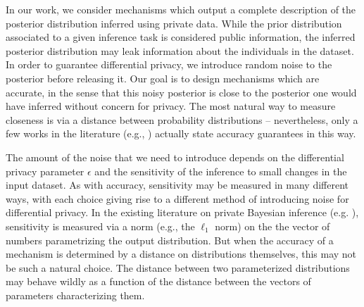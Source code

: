 \documentclass{article}
\begin{document}
%


In our work, we consider mechanisms which output a complete description of the posterior
distribution inferred using private data.
While the prior distribution associated to a given inference task is considered public information,
the inferred posterior distribution may leak information about the individuals in the dataset.
In order to guarantee differential privacy, we introduce random noise to the posterior before releasing it.
Our goal is to design mechanisms which are accurate, in the sense that this noisy posterior is close
to the posterior one would have inferred without concern for privacy. The most natural way
to measure closeness is via a distance between probability distributions -- nevertheless, only a few works 
in the literature (e.g., \cite{zhang2016differential}) actually state accuracy guarantees in this way.






The amount of the noise that we need to introduce
depends on the differential privacy parameter $\epsilon$ and the sensitivity of the inference to
small changes in the input dataset.
As with accuracy, sensitivity may be measured in many different ways, with each choice giving rise to a different
method of introducing noise for differential privacy.
In the existing literature on private Bayesian
inference (e.g. \cite{zhang2016differential,xiao2012bayesian}), sensitivity is measured via a norm (e.g., the $\ell_1$ norm)
on the the vector of numbers parametrizing the output distribution. But when the accuracy of a mechanism is determined by
a distance on distributions themselves, this may not be such a natural choice. The distance between
two parameterized distributions may behave wildly as a function of the distance between the vectors of parameters characterizing them.
\end{document}
